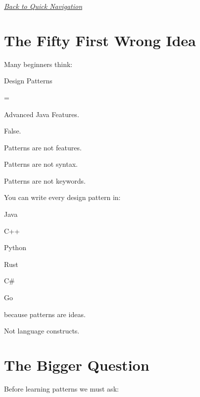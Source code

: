 \documentclass[11pt,a4paper]{book}
\begin{document}
\smallskip
\noindent
\hyperref[sec:quick_nav]{\emph{Back to Quick Navigation}}


\section{The Fifty First Wrong Idea}

\begin{trap}

Many beginners think:


Design Patterns

=

Advanced Java Features.


False.


Patterns are not features.

Patterns are not syntax.

Patterns are not keywords.


You can write every design pattern in:

Java

C++

Python

Rust

C\#

Go


because patterns are ideas.

Not language constructs.

\end{trap}


\section{The Bigger Question}

Before learning patterns we must ask:

\end{document}

